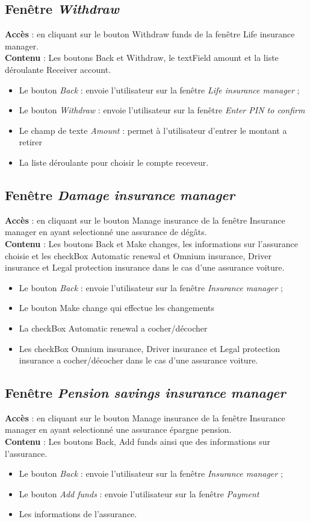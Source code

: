 \documentclass{article}
\newcommand{\navbutton}[2]{Le bouton \emph{#1} : envoie l'utilisateur sur la fenêtre \emph{#2}}
\newcommand{\textfield}[2]{Le champ de texte \emph{#1} : permet à l'utilisateur d'entrer #2}
\newcommand{\access}[1]{ \noindent\textbf{Accès} : #1 \\}
\newcommand{\content}[1]{\textbf{Contenu} : #1}
\begin{document}
\subsection{Fenêtre \emph{Withdraw}}
\access{en cliquant sur le bouton Withdraw funds de la fenêtre Life insurance manager.}
\content{Les boutons Back et Withdraw, le textField amount et la liste déroulante Receiver account.}
\begin{itemize}
\item \navbutton{Back}{Life insurance manager} ;
\item \navbutton{Withdraw}{Enter PIN to confirm}
\item \textfield{Amount}{le montant a retirer}
\item La liste déroulante pour choisir le compte receveur.
\end{itemize}


\subsection{Fenêtre \emph{Damage insurance manager}}
\access{en cliquant sur le bouton Manage insurance de la fenêtre Insurance manager en ayant selectionné une assurance de dégâts.}
\content{Les boutons Back et Make changes, les informations sur l'assurance choisie et les checkBox Automatic renewal et Omnium insurance, Driver insurance et Legal protection insurance dans le cas d'une assurance voiture.}
\begin{itemize}
\item \navbutton{Back}{Insurance manager} ;
\item Le bouton Make change qui effectue les changements
\item La checkBox Automatic renewal a cocher/décocher
\item Les checkBox Omnium insurance, Driver insurance et Legal protection insurance a cocher/décocher dans le cas d'une assurance voiture.
\end{itemize}


\subsection{Fenêtre \emph{Pension savings insurance manager}}
\access{en cliquant sur le bouton Manage insurance de la fenêtre Insurance manager en ayant selectionné une assurance épargne pension.}
\content{Les boutons Back, Add funds ainsi que des informations sur l'assurance.}
\begin{itemize}
\item \navbutton{Back}{Insurance manager} ;
\item \navbutton{Add funds}{Payment}
\item Les informations de l'assurance.
\end{itemize}
\end{document}
